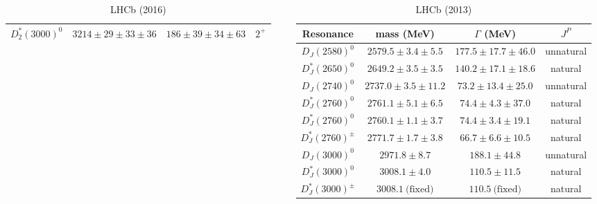 \documentclass[professionalfonts,aspectratio=169]{beamer}
\begin{document}
\begin{frame}
\begin{columns}
\begin{column}{0.5\textwidth}
\begin{table}
\begin{tabular}{*{4}{@{\hskip 2pt}c@{\hskip 2pt}}}
          \alert{$D^*_2(3000)^0$}   & $3214   \pm 29  \pm 33  \pm 36$   & $186   \pm 39  \pm 34  \pm 63$   & $2^+$ \\
          \bottomrule
        \end{tabular}
        \caption*{\tiny LHCb (2016)}
      \end{table}
      \vspace*{-3\baselineskip}
    \end{column}
    \begin{column}{0.5\textwidth}
      \begin{table}
        \fontsize{4.5pt}{6pt}\selectfont
        \centering
        \begin{tabular}{*{4}{@{\hskip 2pt}c@{\hskip 2pt}}}
          \toprule
          Resonance & mass (MeV) & $\Gamma$ (MeV) & $J^P$ \\ 
          \midrule
          $D_J(2580)^0$     & $2579.5 \pm 3.4 \pm 5.5$  & $177.5 \pm 17.7 \pm 46.0$ & unnatural \\
          \addlinespace[2pt]
          $D^*_J(2650)^0$   & $2649.2 \pm 3.5 \pm 3.5$  & $140.2 \pm 17.1 \pm 18.6$ & natural \\
          \addlinespace[2pt]
          $D_J(2740)^0$     & $2737.0 \pm 3.5 \pm 11.2$ & $73.2 \pm 13.4 \pm 25.0$  & unnatural \\
          \addlinespace[2pt]
          $D^*_J(2760)^0$   & $2761.1 \pm 5.1 \pm 6.5$  & $74.4 \pm 4.3 \pm 37.0$   & natural \\
          $D^*_J(2760)^0$   & $2760.1 \pm 1.1 \pm 3.7$  & $74.4 \pm 3.4 \pm 19.1$   & natural \\
          $D^*_J(2760)^\pm$ & $2771.7 \pm 1.7 \pm 3.8$  & $66.7 \pm 6.6 \pm 10.5$   & natural \\
          \addlinespace[2pt]
          $D_J(3000)^0$     & $2971.8 \pm 8.7$          & $188.1 \pm 44.8$          & unnatural \\
          \addlinespace[2pt]
          $D^*_J(3000)^0$   & $3008.1 \pm 4.0$          & $110.5 \pm 11.5$          & natural \\
          $D^*_J(3000)^\pm$ & $3008.1 \ \text{(fixed)}$ & $110.5 \ \text{(fixed)}$  & natural \\
          \bottomrule
        \end{tabular}
        \caption*{\tiny LHCb (2013)}
      \end{table}
      \vspace*{-3\baselineskip}
    \end{column}
  \end{columns}
\end{frame}
\end{document}
